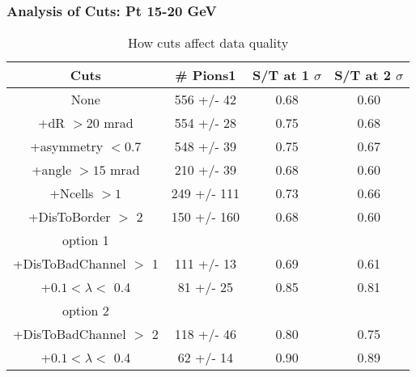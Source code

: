 \frame
{
\frametitle{Analysis of Cuts: Pt 15-20 GeV}
\begin{table}
\caption{How cuts affect data quality}
\centering
\begin{tabular}{c c c c}
\hline\hline
Cuts & \# Pions1 & S/T at 1 $\sigma$ & S/T at 2 $\sigma$ \\ [0.5ex]
\hline
None &  556 +/-   42 & 0.68 & 0.60 \\ %
+dR $> 20$ mrad &  554 +/-   28 & 0.75 & 0.68 \\ %
+asymmetry $< 0.7$ &  548 +/-   39 & 0.75 & 0.67 \\ %
+angle $> 15$ mrad &  210 +/-   39 & 0.68 & 0.60 \\ %
+Ncells $> 1$&  249 +/-  111 & 0.73 & 0.66 \\ %
+DisToBorder $>$ 2 &  150 +/-  160 & 0.68 & 0.60 \\ %
option 1\\
+DisToBadChannel $>$ 1&  111 +/-   13 & 0.69 & 0.61 \\ %
+$0.1 < \lambda <$ 0.4 &   81 +/-   25 & 0.85 & 0.81 \\ %
option 2\\
+DisToBadChannel $>$ 2&  118 +/-   46 & 0.80 & 0.75 \\ %
+$0.1 < \lambda <$ 0.4 &   62 +/-   14 & 0.90 & 0.89 \\ %
[1ex]
\hline
\end{tabular}
\label{table:nonlin}
\end{table}
}
